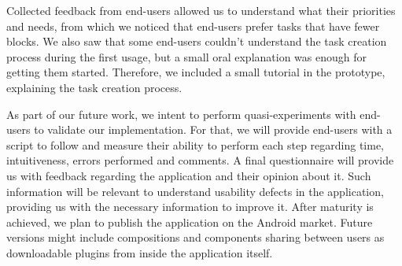 \documentclass[9pt,a4paper]{extarticle}
\begin{document}
\begin{multicols}{2}
Collected feedback from end-users allowed us to understand what their priorities and needs, from which we noticed that end-users prefer tasks that have fewer blocks. We also saw that some end-users couldn't understand the task creation process during the first usage, but a small oral explanation was enough for getting them started. Therefore, we included a small tutorial in the prototype, explaining the task creation process.

As part of our future work, we intent to perform quasi-experiments with end-users to validate our implementation. For that, we will provide end-users with a script to follow and measure their ability to perform each step regarding time, intuitiveness, errors performed and comments. A final questionnaire will provide us with feedback regarding the application and their opinion about it. Such information will be relevant to understand usability defects in the application, providing us with the necessary information to improve it. After maturity is achieved, we plan to publish the application on the Android market. Future versions might include compositions and components sharing between users as downloadable plugins from inside the application itself.



\end{multicols}
\end{document}
